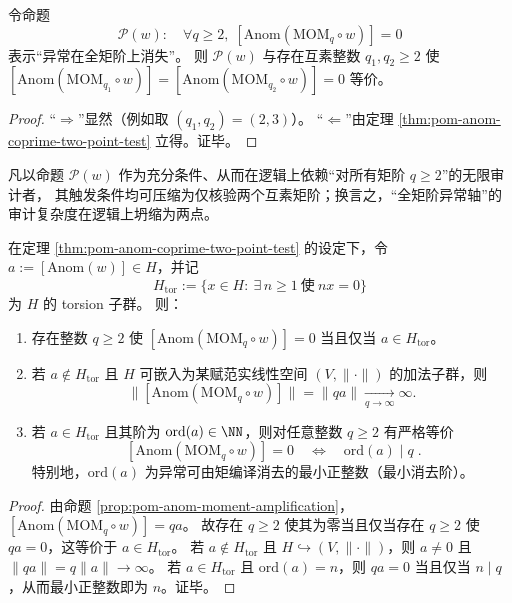 \begin{theorem}\label{thm:pom-anom-all-moments-collapse-to-two}
令命题
\[
\mathcal P(w):\quad \forall q\ge 2,\;[\mathrm{Anom}(\mathrm{MOM}_q\circ w)]=0
\]
表示“异常在全矩阶上消失”。
则 \(\mathcal P(w)\) 与存在互素整数 \(q_1,q_2\ge 2\) 使
\(
[\mathrm{Anom}(\mathrm{MOM}_{q_1}\circ w)]=[\mathrm{Anom}(\mathrm{MOM}_{q_2}\circ w)]=0
\)
等价。
\end{theorem}
\begin{proof}
“\(\Rightarrow\)”显然（例如取 \((q_1,q_2)=(2,3)\)）。
“\(\Leftarrow\)”由定理 \ref{thm:pom-anom-coprime-two-point-test} 立得。证毕。
\end{proof}

\begin{corollary}\label{cor:pom-anom-oracle-collapse-two-point-trigger}
凡以命题 \(\mathcal P(w)\) 作为充分条件、从而在逻辑上依赖“对所有矩阶 \(q\ge 2\)”的无限审计者，
其触发条件均可压缩为仅核验两个互素矩阶；换言之，“全矩阶异常轴”的审计复杂度在逻辑上坍缩为两点。
\end{corollary}

\begin{theorem}\label{thm:pom-anom-torsion-eliminability-min-order}
在定理 \ref{thm:pom-anom-coprime-two-point-test} 的设定下，令 \(a:=[\mathrm{Anom}(w)]\in H\)，并记
\[
H_{\mathrm{tor}}:=\{x\in H:\ \exists\,n\ge 1\ \text{使}\ nx=0\}
\]
为 \(H\) 的 torsion 子群。
则：
\begin{enumerate}
  \item 存在整数 \(q\ge 2\) 使 \([\mathrm{Anom}(\mathrm{MOM}_q\circ w)]=0\) 当且仅当 \(a\in H_{\mathrm{tor}}\)。
  \item 若 \(a\notin H_{\mathrm{tor}}\) 且 \(H\) 可嵌入为某赋范实线性空间 \((V,\|\cdot\|)\) 的加法子群，则
  \[
  \bigl\|[\mathrm{Anom}(\mathrm{MOM}_q\circ w)]\bigr\|
  =\|qa\|\xrightarrow[q\to\infty]{}\infty.
  \]
  \item 若 \(a\in H_{\mathrm{tor}}\) 且其阶为 \(\mathrm{ord}(a)\in\NN\)，则对任意整数 \(q\ge 2\) 有严格等价
  \[
  \boxed{\;
  [\mathrm{Anom}(\mathrm{MOM}_q\circ w)]=0\quad\Longleftrightarrow\quad \mathrm{ord}(a)\mid q\; }.
  \]
  特别地，\(\mathrm{ord}(a)\) 为异常可由矩编译消去的最小正整数（最小消去阶）。
\end{enumerate}
\end{theorem}
\begin{proof}
由命题 \ref{prop:pom-anom-moment-amplification}，
\(
[\mathrm{Anom}(\mathrm{MOM}_q\circ w)]=qa
\)。
故存在 \(q\ge 2\) 使其为零当且仅当存在 \(q\ge 2\) 使 \(qa=0\)，这等价于 \(a\in H_{\mathrm{tor}}\)。
若 \(a\notin H_{\mathrm{tor}}\) 且 \(H\hookrightarrow (V,\|\cdot\|)\)，则 \(a\neq 0\) 且 \(\|qa\|=q\|a\|\to\infty\)。
若 \(a\in H_{\mathrm{tor}}\) 且 \(\mathrm{ord}(a)=n\)，则 \(qa=0\) 当且仅当 \(n\mid q\)，从而最小正整数即为 \(n\)。证毕。
\end{proof}

